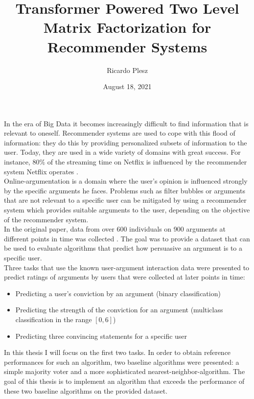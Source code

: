 \documentclass{article}
\title{\textbf{Transformer Powered Two Level Matrix Factorization for Recommender Systems}}
\author{Ricardo Plesz}
\date{August 18, 2021}
\begin{document}
    
\maketitle

In the era of Big Data it becomes increasingly difficult to find information that is relevant to oneself. 
Recommender systems are used to cope with this flood of information: 
they do this by providing personalized subsets of information to the user. 
Today, they are used in a wide variety of domains with great success. For instance, $80\%$ of the
streaming time on Netflix is influenced by the recommender system Netflix operates \cite{gomez2015netflix}. 
\\

Online-argumentation is a domain where the user's opinion is influenced strongly by the
specific arguments he faces. Problems such as filter bubbles or arguments that
are not relevant to a specific user can be mitigated by using a recommender system
which provides suitable arguments to the user, depending on the objective of the recommender system.\\
In the original paper, data from over 600 individuals on 900 arguments at different points in time was collected \cite{HowIArgue}.
The goal was to provide a dataset that can be used to evaluate algorithms that predict how persuasive 
an argument is to a specific user.\\
Three tasks that use the known user-argument interaction data were presented to predict ratings of arguments 
by users that were collected at later points in time:
\begin{itemize}
    \item Predicting a user's conviction by an argument (binary classification)
    \item Predicting the strength of the conviction for an argument (multiclass classification in the range $[0,6]$)
    \item Predicting three convincing statements for a specific user
\end{itemize}
In this thesis I will focus on the first two tasks.
In order to obtain reference performances for such an algorithm, two baseline algorithms
were presented: a simple majority voter and a more sophisticated nearest-neighbor-algorithm.
The goal of this thesis is to implement an algorithm that exceeds the performance of these two 
baseline algorithms on the provided dataset.
\\
\end{document}
